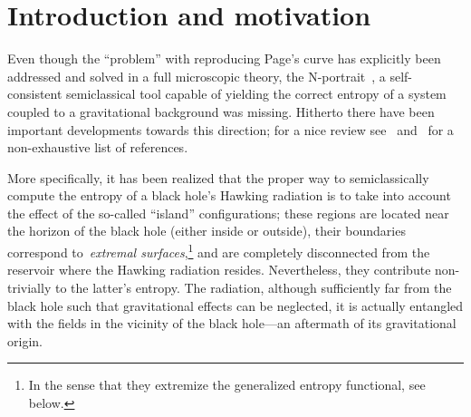 \documentclass[a4paper, 12pt]{article}
\begin{document}
\begin{titlepage}
\begin{abstract}
\end{abstract}

\end{titlepage}


\section{Introduction and motivation}


 Even though the ``problem'' with reproducing Page's curve has explicitly been addressed and solved in a full microscopic theory, the N-portrait~\cite{Dvali:2011aa,Dvali:2012rt,Dvali:2012wq,Dvali:2015aja}, a self-consistent semiclassical tool capable of yielding the correct entropy of a system coupled to a gravitational background was missing. Hitherto there have been important developments towards this direction; for a nice review see~\cite{Almheiri:2020cfm} and~\cite{Penington:2019npb,Almheiri:2019psf,Almheiri:2019hni,Almheiri:2019yqk,Chen:2019uhq,Almheiri:2019psy,Penington:2019kki,Almheiri:2019qdq,Chen:2019iro,Bhattacharya:2020ymw,Gautason:2020tmk,Anegawa:2020ezn,Hashimoto:2020cas,Hartman:2020swn,Hollowood:2020cou,Krishnan:2020oun,Alishahiha:2020qza,Banks:2020zrt,Geng:2020qvw,Chen:2020uac,Chandrasekaran:2020qtn,Li:2020ceg,Bak:2020enw,Bousso:2020kmy,Hollowood:2020kvk,Krishnan:2020fer,Engelhardt:2020qpv,Karlsson:2020uga,Gomez:2020yef,Chen:2020jvn,Hartman:2020khs,Balasubramanian:2020coy,Balasubramanian:2020xqf,Sybesma:2020fxg,Chen:2020hmv,Ling:2020laa,Bhattacharya:2020uun,Marolf:2020rpm,Hernandez:2020nem,Matsuo:2020ypv,Goto:2020wnk,Akal:2020twv,Basak:2020aaa,Caceres:2020jcn,Raju:2020smc,Manu:2020tty,Deng:2020ent} for a non-exhaustive list of references. 


More specifically, it has been realized that the proper way to semiclassically compute the  entropy of a black hole's Hawking radiation is to take into account the effect of the so-called ``island'' configurations; these regions are located near the horizon of the black hole (either inside or outside), their boundaries correspond to~\emph{extremal surfaces},\footnote{In the sense that they extremize the generalized entropy functional, see below.} and are completely disconnected from the reservoir where the Hawking radiation resides. Nevertheless, they contribute non-trivially to the latter's entropy. The radiation, although sufficiently far from the black hole such that gravitational effects can be neglected, it is actually entangled with the fields in the vicinity of the black hole---an aftermath of its gravitational origin. 
\end{document}
